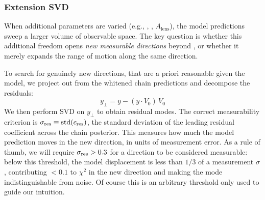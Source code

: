 \subsubsection{Extension SVD}
\label{sec:extension_svd_method}


When additional parameters are varied (e.g., \wowa, \Omk, $A_\mathrm{lens}$), the model predictions sweep a larger volume of observable space. The key question is whether this additional freedom opens \emph{new measurable directions} beyond \czero, or whether it merely expands the range of motion along the same direction.

To search for genuinely new directions, that are a priori reasonable given the model, we project out \czero from the whitened chain predictions and decompose the residuals:
\begin{equation}
y_\perp = y - (y \cdot V_0)\, V_0
\end{equation}
We then perform SVD on $y_\perp$ to obtain residual modes. The correct measurability criterion is $\sigma_{\mathrm{res}} \equiv \mathrm{std}(c_\mathrm{res})$, the standard deviation of the leading residual coefficient across the chain posterior. This measures how much the model prediction moves in the new direction, in units of measurement error. As a rule of thumb, we will require $\sigma_{\mathrm{res}} > 0.3$ for a direction to be considered measurable: below this threshold, the model displacement is less than $1/3$ of a measurement $\sigma$, contributing $< 0.1$ to $\chi^2$ in the new direction and making the mode indistinguishable from noise. Of course this is an arbitrary threshold only used to guide our intuition.
